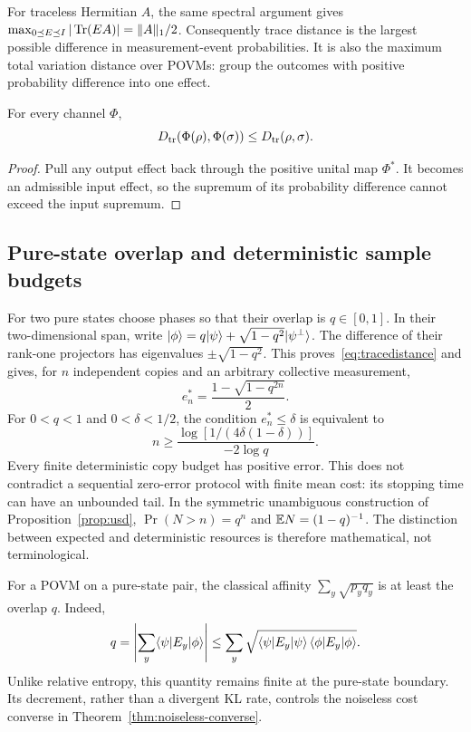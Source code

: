 For traceless Hermitian $A$, the same spectral argument gives
$\max_{0\preceq E\preceq I}|\operatorname{Tr}(EA)|=\|A\|_1/2$.
Consequently trace distance is the largest possible difference in
measurement-event probabilities. It is also the maximum total
variation distance over POVMs: group the outcomes with positive
probability difference into one effect.

\begin{corollary}
For every channel $\Phi$,
\begin{equation}
 D_{\rm tr}(\Phi(\rho),\Phi(\sigma))
 \leq D_{\rm tr}(\rho,\sigma).
\end{equation}
\end{corollary}
\begin{proof}
Pull any output effect back through the positive unital map $\Phi^*$.
It becomes an admissible input effect, so the supremum of its probability
difference cannot exceed the input supremum.
\end{proof}

\subsection{Pure-state overlap and deterministic sample budgets}
For two pure states choose phases so that their overlap is
$q\in[0,1]$. In their two-dimensional span, write
$\lvert \phi\rangle=q\lvert \psi\rangle+\sqrt{1-q^2}\lvert \psi^\perp\rangle$.
The difference of their rank-one projectors has eigenvalues
$\pm\sqrt{1-q^2}$. This proves~\eqref{eq:tracedistance} and gives,
for $n$ independent copies and an arbitrary collective measurement,
\begin{equation}\label{eq:pure-fixed-budget}
 e_n^*=\frac{1-\sqrt{1-q^{2n}}}{2}.
\end{equation}
For $0<q<1$ and $0<\delta<1/2$, the condition $e_n^*\leq\delta$
is equivalent to
\[
 n\geq\frac{\log[1/(4\delta(1-\delta))]}{-2\log q}.
\]
Every finite deterministic copy budget has positive error. This does not
contradict a sequential zero-error protocol with finite mean cost:
its stopping time can have an unbounded tail. In the symmetric
unambiguous construction of Proposition~\ref{prop:usd},
$\Pr(N>n)=q^n$ and $\mathbb E N=(1-q)^{-1}$.
The distinction between expected and deterministic resources is therefore
mathematical, not terminological.

For a POVM on a pure-state pair, the classical affinity
$\sum_y\sqrt{p_yq_y}$ is at least the overlap $q$.
Indeed,
\[
 q=\left|\sum_y\langle \psi\rvert E_y\lvert \phi\rangle\right|
 \leq\sum_y\sqrt{\langle \psi\rvert E_y\lvert \psi\rangle\,
                        \langle \phi\rvert E_y\lvert \phi\rangle}.
\]
Unlike relative entropy, this quantity remains finite at the pure-state
boundary. Its decrement, rather than a divergent KL rate, controls the
noiseless cost converse in Theorem~\ref{thm:noiseless-converse}.

